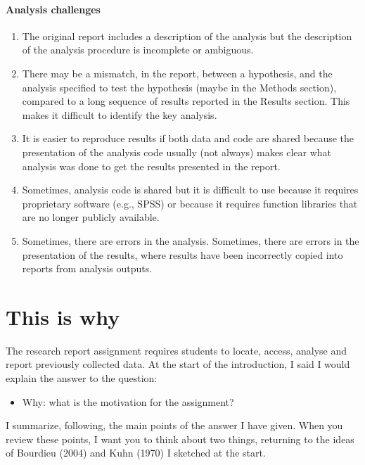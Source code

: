 \documentclass[
  letterpaper,
  DIV=11,
  numbers=noendperiod]{scrreprt}
\let\oldparagraph\paragraph
\renewcommand{\paragraph}[1]{\oldparagraph{#1}\mbox{}}
\providecommand{\tightlist}{%
  \setlength{\itemsep}{0pt}\setlength{\parskip}{0pt}}\usepackage{longtable,booktabs,array}
\begin{document}
\hypertarget{sec-analysischallenges}{%
\paragraph{Analysis challenges}\label{sec-analysischallenges}}

\begin{enumerate}
\def\labelenumi{\arabic{enumi}.}
\tightlist
\item
  The original report includes a description of the analysis but the
  description of the analysis procedure is incomplete or ambiguous.
\item
  There may be a mismatch, in the report, between a hypothesis, and the
  analysis specified to test the hypothesis (maybe in the Methods
  section), compared to a long sequence of results reported in the
  Results section. This makes it difficult to identify the key analysis.
\item
  It is easier to reproduce results if both data and code are shared
  because the presentation of the analysis code usually (not always)
  makes clear what analysis was done to get the results presented in the
  report.
\item
  Sometimes, analysis code is shared but it is difficult to use because
  it requires proprietary software (e.g., SPSS) or because it requires
  function libraries that are no longer publicly available.
\item
  Sometimes, there are errors in the analysis. Sometimes, there are
  errors in the presentation of the results, where results have been
  incorrectly copied into reports from analysis outputs.
\end{enumerate}

\hypertarget{this-is-why}{%
\section{This is why}\label{this-is-why}}

The research report assignment requires students to locate, access,
analyse and report previously collected data. At the start of the
introduction, I said I would explain the answer to the question:

\begin{itemize}
\tightlist
\item
  Why: what is the motivation for the assignment?
\end{itemize}

I summarize, following, the main points of the answer I have given. When
you review these points, I want you to think about two things, returning
to the ideas of Bourdieu (2004) and Kuhn (1970) I sketched at the start.
\end{document}
